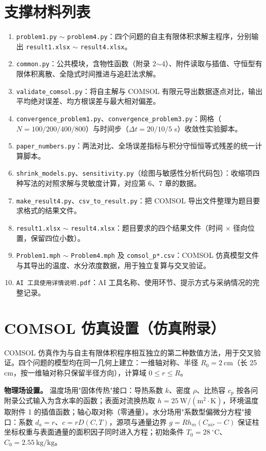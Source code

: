 \documentclass[12pt,a4paper]{article}
\begin{document}
\begin{center}
\section{支撑材料列表}

\begin{enumerate}[label=(\arabic*)]
  \item \texttt{problem1.py} $\sim$ \texttt{problem4.py}：四个问题的自主有限体积求解主程序，分别输出 \texttt{result1.xlsx} $\sim$ \texttt{result4.xlsx}。
  \item \texttt{common.py}：公共模块，含物性函数（附录 2$\sim$4）、附件读取与插值、守恒型有限体积离散、全隐式时间推进与追赶法求解。
  \item \texttt{validate\_comsol.py}：将自主解与 COMSOL 有限元导出数据逐点对比，输出平均绝对误差、均方根误差与最大相对偏差。
  \item \texttt{convergence\_problem1.py}、\texttt{convergence\_problem3.py}：网格（$N=100/200/400/800$）与时间步（$\Delta t=20/10/5$ s）收敛性实验脚本。
  \item \texttt{paper\_numbers.py}：两法对比、全场误差指标与积分守恒恒等式残差的统一计算脚本。
  \item \texttt{shrink\_models.py}、\texttt{sensitivity.py}（绘图与敏感性分析代码包）：收缩项四种写法的对照求解与灵敏度计算，对应第 6、7 章的数据。
  \item \texttt{make\_result4.py}、\texttt{csv\_to\_result.py}：把 COMSOL 导出文件整理为题目要求格式的结果文件。
  \item \texttt{result1.xlsx} $\sim$ \texttt{result4.xlsx}：题目要求的四个结果文件（时间 $\times$ 径向位置，保留四位小数）。
  \item \texttt{Problem1.mph} $\sim$ \texttt{Problem4.mph} 及 \texttt{comsol\_p*.csv}：COMSOL 仿真模型文件与其导出的温度、水分浓度数据，用于独立复算与交叉验证。
  \item \texttt{AI 工具使用详情说明.pdf}：AI 工具名称、使用环节、提示方式与采纳情况的完整记录。
\end{enumerate}

\section{COMSOL 仿真设置（仿真附录）}

COMSOL 仿真作为与自主有限体积程序相互独立的第二种数值方法，用于交叉验证。四个问题的模型均在同一几何上建立：一维轴对称、半径 $R_0=2\ \mathrm{cm}$（长 25 cm，按一维轴对称只保留半径方向），计算域 $0\le r\le R$。

\textbf{物理场设置。} 温度场用"固体传热"接口：导热系数 $k$、密度 $\rho$、比热容 $c_p$ 按各问附录公式输入为含水率的函数；表面对流换热取 $h=25\ \mathrm{W/(m^2\cdot K)}$，环境温度取附件 1 的插值函数；轴心取对称（零通量）。水分场用"系数型偏微分方程"接口：系数 $d_a=r$、$c=rD(C,T)$，源项与通量边界 $g=Rh_m(C_{air}-C)$ 保证柱坐标权重与表面通量的面积因子同时进入方程；初始条件 $T_0=28\ \mathrm{^\circ C}$、$C_0=2.55\ \mathrm{kg/kg}$。


\end{center}
\end{document}
